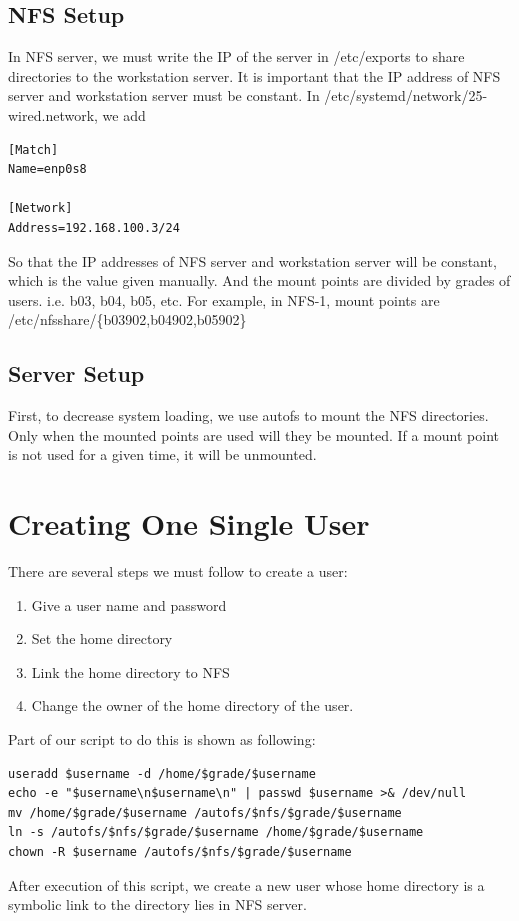 \documentclass{article}
\begin{document}
\subsection{NFS Setup}
In NFS server, we must write the IP of the server in {\cs /etc/exports} to share directories to the workstation server.
It is important that the IP address of NFS server and workstation server must be constant.
In {\cs /etc/systemd/network/25-wired.network}, we add \\
\begin{verbatim}
[Match]
Name=enp0s8

[Network]
Address=192.168.100.3/24
\end{verbatim}
So that the IP addresses of NFS server and workstation server will be constant, which is the value given manually.
And the mount points are divided by grades of users. i.e. b03, b04, b05, etc. For example, in NFS-1, mount points are
/etc/nfsshare/\{b03902,b04902,b05902\}
\subsection{Server Setup}
First, to decrease system loading, we use {\cs autofs} to mount the NFS directories. Only when the mounted points are used will they be mounted. 
If a mount point is not used for a given time, it will be unmounted. 

\section{Creating One Single User}
There are several steps we must follow to create a user:
   \begin{enumerate}
   \item Give a user name and password
   \item Set the home directory
   \item Link the home directory to NFS
   \item Change the owner of the home directory of the user.
   \end{enumerate}
Part of our script to do this is shown as following:
\begin{framed}
\begin{verbatim}
useradd $username -d /home/$grade/$username
echo -e "$username\n$username\n" | passwd $username >& /dev/null
mv /home/$grade/$username /autofs/$nfs/$grade/$username
ln -s /autofs/$nfs/$grade/$username /home/$grade/$username
chown -R $username /autofs/$nfs/$grade/$username
\end{verbatim}
\end{framed}
After execution of this script, we create a new user whose home directory is a symbolic link to the directory lies in NFS server.
\end{document}
